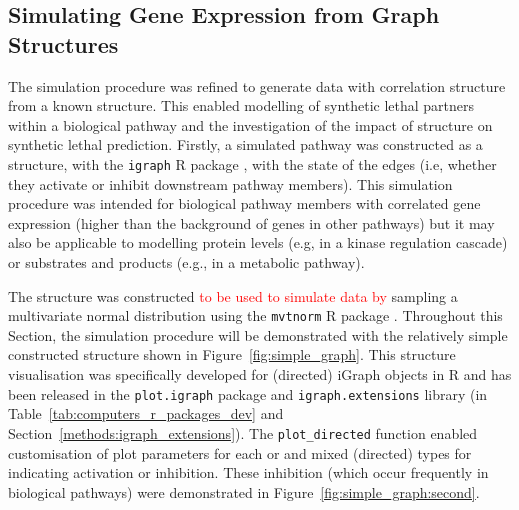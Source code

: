 \subsection{Simulating Gene Expression from Graph Structures} \label{methods:graphsim}
The simulation procedure was refined to generate  data with correlation structure from a known  structure. %
This enabled modelling of \gls{synthetic lethal} partners within a biological pathway and the investigation of the impact of  structure on \gls{synthetic lethal} prediction. Firstly, a simulated pathway was constructed as a  structure, with the \texttt{igraph} R package \citet{igraph}, with the state of the \glspl{edge} (i.e, whether they activate or inhibit downstream pathway members). This simulation procedure was intended for biological pathway members with correlated \gls{gene expression} (higher than the background of genes in other pathways) but it may also be applicable to modelling protein levels (e.g, in a kinase regulation cascade) or substrates and products (e.g., in a metabolic pathway).%

The  structure was constructed \textcolor{red}{to be used to simulate data by} sampling a multivariate normal distribution using the \texttt{mvtnorm} R package \citep{Genz2009, mvtnorm}. Throughout this Section, the simulation procedure will be demonstrated with the relatively simple constructed  structure shown in Figure~\ref{fig:simple_graph}. This  structure visualisation was specifically developed for (directed) iGraph objects in R and has been released in the \texttt{plot.igraph} package and \texttt{igraph.extensions} library (in Table~\ref{tab:computers_r_packages_dev} and Section~\ref{methods:igraph_extensions}). The \texttt{plot\_directed} function enabled customisation of plot parameters for each  or  and mixed (directed)  types for indicating activation or inhibition. These inhibition  (which occur frequently in biological pathways) were demonstrated in Figure~\ref{fig:simple_graph:second}.

